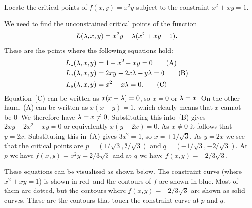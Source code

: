 \documentclass[a4paper]{amsart}
\renewenvironment{solution}{\SolutionInline}{\endSolutionInline}
\begin{document}
\begin{exercise}
 Locate the critical points of $f(x,y)=x^2y$ subject to the constraint
 $x^2+xy=1$.
\end{exercise}
\begin{solution}
 We need to find the unconstrained critical points of the function
 \[ L(\lambda,x,y) = x^2y - \lambda(x^2+xy-1). \]
 These are the points where the following equations hold:
 \begin{align*}
  L_\lambda(\lambda,x,y) &= 1-x^2-xy = 0 \tag{A} \\
  L_x(\lambda,x,y)   &= 2xy-2x\lambda-y\lambda = 0 \tag{B} \\
  L_y(\lambda,x,y)   &= x^2-x\lambda = 0. \tag{C}
 \end{align*}
 Equation~(C) can be written as $x(x-\lambda)=0$, so $x=0$ or
 $\lambda=x$.  On the other hand, (A) can be written as
 $x(x+y)=1$, which clearly means that $x$ cannot be $0$.  We therefore
 have $\lambda=x\neq 0$.  Substituting this into~(B) gives
 $2xy-2x^2-xy=0$ or equivalently $x(y-2x)=0$.  As $x\neq 0$ it follows
 that $y=2x$.  Substituting this in~(A) gives $3x^2=1$, so
 $x=\pm 1/\sqrt{3}$.  As $y=2x$ we see that the critical points are
 $p=(1/\sqrt{3},2/\sqrt{3})$ and $q=(-1/\sqrt{3},-2/\sqrt{3})$.  At
 $p$ we have $f(x,y)=x^2y=2/3\sqrt{3}$ and at $q$ we have
 $f(x,y)=-2/3\sqrt{3}$.  

 These equations can be visualised as shown below.  The constraint
 curve (where $x^2+xy=1$) is shown in red, and the contours of $f$ are
 shown in blue.  Most of them are dotted, but the contours where
 $f(x,y)=\pm 2/3\sqrt{3}$ are shown as solid curves.  These are the
 contours that touch the constraint curve at $p$ and $q$.
 \begin{center}
 \end{center}
\end{solution}
\end{document}
